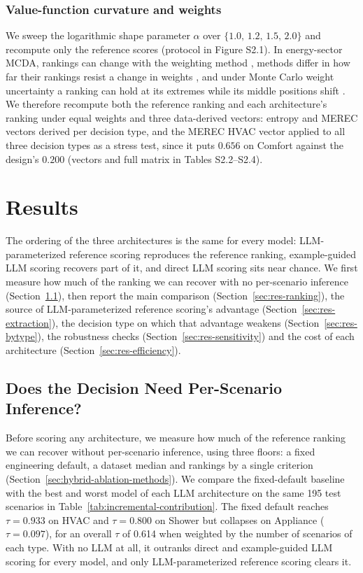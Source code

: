 \documentclass[final,3p,times]{elsarticle}
\begin{document}
\subsubsection{Value-function curvature and weights}
\label{sec:sensitivity-methods}
We sweep the logarithmic shape parameter $\alpha$ over $\{1.0,\,1.2,\,1.5,\,2.0\}$ and recompute only the reference scores (protocol in Figure S2.1). In energy-sector MCDA, rankings can change with the weighting method \cite{sahin2021weighting}, methods differ in how far their rankings resist a change in weights \cite{sahabuddin2021robustness}, and under Monte Carlo weight uncertainty a ranking can hold at its extremes while its middle positions shift \cite{heymann2026ai}. We therefore recompute both the reference ranking and each architecture's ranking under equal weights and three data-derived vectors: entropy and MEREC vectors derived per decision type, and the MEREC HVAC vector applied to all three decision types as a stress test, since it puts $0.656$ on Comfort against the design's $0.200$ (vectors and full matrix in Tables S2.2--S2.4).

\FloatBarrier
\section{Results}
\label{sec:results}
The ordering of the three architectures is the same for every model: LLM-parameterized reference scoring reproduces the reference ranking, example-guided LLM scoring recovers part of it, and direct LLM scoring sits near chance. We first measure how much of the ranking we can recover with no per-scenario inference (Section~\ref{sec:res-baselines}), then report the main comparison (Section~\ref{sec:res-ranking}), the source of LLM-parameterized reference scoring's advantage (Section~\ref{sec:res-extraction}), the decision type on which that advantage weakens (Section~\ref{sec:res-bytype}), the robustness checks (Section~\ref{sec:res-sensitivity}) and the cost of each architecture (Section~\ref{sec:res-efficiency}).

\FloatBarrier
\subsection{Does the Decision Need Per-Scenario Inference?}
\label{sec:res-baselines}
Before scoring any architecture, we measure how much of the reference ranking we can recover without per-scenario inference, using three floors: a fixed engineering default, a dataset median and rankings by a single criterion (Section~\ref{sec:hybrid-ablation-methods}). We compare the fixed-default baseline with the best and worst model of each LLM architecture on the same 195 test scenarios in Table~\ref{tab:incremental-contribution}. The fixed default reaches $\tau = 0.933$ on HVAC and $\tau = 0.800$ on Shower but collapses on Appliance ($\tau = 0.097$), for an overall $\tau$ of 0.614 when weighted by the number of scenarios of each type. With no LLM at all, it outranks direct and example-guided LLM scoring for every model, and only LLM-parameterized reference scoring clears it.
\end{document}

